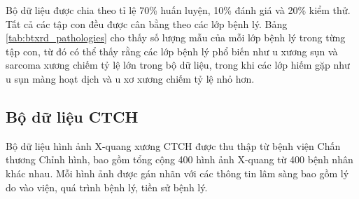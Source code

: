 \begin{table}[htbp]
\centering
\small
{}
\caption{Phân bổ các lớp đơn nhãn sau chuẩn hóa trong bộ dữ liệu BTXRD}
\label{tab:btxrd_pathologies}
\end{table}

Bộ dữ liệu được chia theo tỉ lệ 70\% huấn luyện, 10\% đánh giá và 20\% kiểm thử. Tất cả các tập con đều được cân bằng theo các lớp bệnh lý. Bảng \ref{tab:btxrd_pathologies} cho thấy số lượng mẫu của mỗi lớp bệnh lý trong từng tập con, từ đó có thể thấy rằng các lớp bệnh lý phổ biến như u xương sụn và sarcoma xương chiếm tỷ lệ lớn trong bộ dữ liệu, trong khi các lớp hiếm gặp như u sụn màng hoạt dịch và u xơ xương chiếm tỷ lệ nhỏ hơn.

\subsection{Bộ dữ liệu CTCH}
Bộ dữ liệu hình ảnh X-quang xương CTCH được thu thập từ bệnh viện Chấn thương Chỉnh hình, bao gồm tổng cộng 400 hình ảnh X-quang từ 400 bệnh nhân khác nhau. Mỗi hình ảnh được gán nhãn với các thông tin lâm sàng bao gồm lý do vào viện, quá trình bệnh lý, tiền sử bệnh lý.
